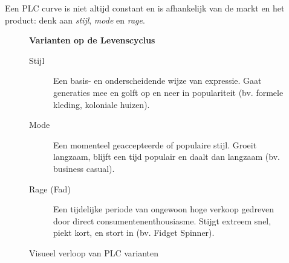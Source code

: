 \documentclass[a4paper,11pt]{article}
\begin{document}
Een PLC curve is niet altijd constant en is
afhankelijk van de markt en het product: denk aan \textit{stijl}, \textit{mode} en \textit{rage}.

\begin{figure}[htbp]
    \centering
    \begin{minipage}{0.45\textwidth}
        \textbf{Varianten op de Levenscyclus}
        \begin{description}
            \item[\textcolor{schoolBlue}{Stijl}] Een basis- en onderscheidende wijze van expressie. Gaat generaties mee en golft op en neer in populariteit (bv. formele kleding, koloniale huizen).
            \item[\textcolor{schoolOrange}{Mode}] Een momenteel geaccepteerde of populaire stijl. Groeit langzaam, blijft een tijd populair en daalt dan langzaam (bv. business casual).
            \item[\textcolor{schoolRed}{Rage (Fad)}] Een tijdelijke periode van ongewoon hoge verkoop gedreven door direct consumentenenthousiasme. Stijgt extreem snel, piekt kort, en stort in (bv. Fidget Spinner).
        \end{description}
    \end{minipage}%
    \hfill
    \begin{minipage}{0.5\textwidth}
        \centering
        \caption{Visueel verloop van PLC varianten}
        \label{fig:plc_types}
    \end{minipage}
\end{figure}
\end{document}
